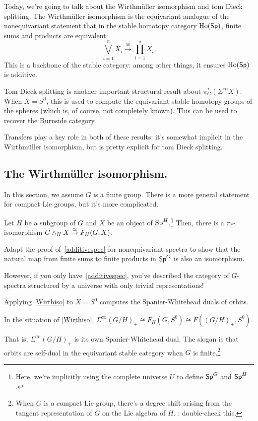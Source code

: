 Today, we're going to talk about the Wirthmüller isomorphism and tom Dieck splitting. The Wirthmüller isomorphism
is the equivariant analogue of the nonequivariant statement that in the stable homotopy category $\operatorname{Ho}(\mathsf{Sp})$,
finite sums and products are equivalent:
\begin{equation}
\label{additivespec}
\bigvee_{i=1}^n X_i\stackrel\cong\longrightarrow \prod_{i=1}^n X_i.
\end{equation}
This is a backbone of the stable category: among other things, it ensures $\operatorname{Ho}(\mathsf{Sp})$ is additive.

Tom Dieck splitting is another important structural result about $\pi_G^*(\Sigma^\infty X)$. When $X = S^0$, this
is used to compute the equivariant stable homotopy groups of the spheres (which is, of course, not completely
known). This can be used to recover the Burnside category.

Transfers play a key role in both of these results: it's somewhat implicit in the Wirthmüller isomorphism, but is
pretty explicit for tom Dieck splitting.
\subsection*{The Wirthmüller isomorphism.}
In this section, we assume $G$ is a finite group. There is a more general statement for compact Lie groups, but
it's more complicated.
\begin{thm}
\label{Wirthiso}
Let $H$ be a subgroup of $G$ and $X$ be an object of $\mathrm{Sp}^H$.\footnote{Here, we're implicitly using the complete
universe $U$ to define $\mathsf{Sp}^G$ and $\mathsf{Sp}^H$.} Then, there is a $\pi_*$-isomorphism $G\wedge_H X\stackrel\simeq\to F_H(G,X)$.
\end{thm}
\begin{ex}
Adapt the proof of~\eqref{additivespec} for nonequivariant spectra to show that the natural map from finite sums to
finite products in $\mathsf{Sp}^G$ is also an isomorphism.
\end{ex}
However, if you only have~\eqref{additivespec}, you've described the category of $G$-spectra structured by a
universe with only trivial representations!

Applying \cref{Wirthiso} to $X = S^0$ computes the Spanier-Whitehead duals of orbits.
\begin{cor}
In the situation of \cref{Wirthiso}, $\Sigma^\infty(G/H)_+\cong F_H(G,S^0)\cong F((G/H)_+, S^0)$.
\end{cor}
That is, $\Sigma^\infty (G/H)_+$ is its own Spanier-Whitehead dual. The slogan is that orbits are self-dual in the
equivariant stable category when $G$ is finite.\footnote{When $G$ is a compact Lie group, there's a degree shift
arising from the tangent representation of $G$ on the Lie algebra of $H$. \TODO: double-check this.}

